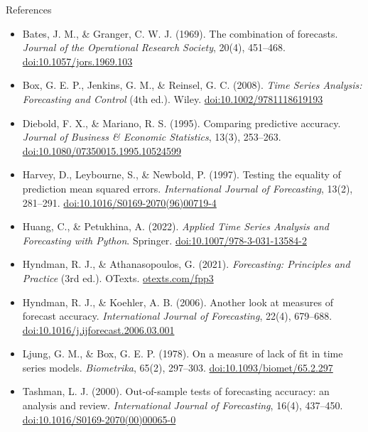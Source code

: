 \begin{frame}{References}
\itemsize{\tiny}
\begin{itemize}
    \item Bates, J. M., \& Granger, C. W. J. (1969). The combination of forecasts. \textit{Journal of the Operational Research Society}, 20(4), 451--468. \href{https://doi.org/10.1057/jors.1969.103}{doi:10.1057/jors.1969.103}
    \item Box, G. E. P., Jenkins, G. M., \& Reinsel, G. C. (2008). \textit{Time Series Analysis: Forecasting and Control} (4th ed.). Wiley. \href{https://doi.org/10.1002/9781118619193}{doi:10.1002/9781118619193}
    \item Diebold, F. X., \& Mariano, R. S. (1995). Comparing predictive accuracy. \textit{Journal of Business \& Economic Statistics}, 13(3), 253--263. \href{https://doi.org/10.1080/07350015.1995.10524599}{doi:10.1080/07350015.1995.10524599}
    \item Harvey, D., Leybourne, S., \& Newbold, P. (1997). Testing the equality of prediction mean squared errors. \textit{International Journal of Forecasting}, 13(2), 281--291. \href{https://doi.org/10.1016/S0169-2070(96)00719-4}{doi:10.1016/S0169-2070(96)00719-4}
    \item Huang, C., \& Petukhina, A. (2022). \textit{Applied Time Series Analysis and Forecasting with Python}. Springer. \href{https://doi.org/10.1007/978-3-031-13584-2}{doi:10.1007/978-3-031-13584-2}
    \item Hyndman, R. J., \& Athanasopoulos, G. (2021). \textit{Forecasting: Principles and Practice} (3rd ed.). OTexts. \href{https://otexts.com/fpp3/}{otexts.com/fpp3}
    \item Hyndman, R. J., \& Koehler, A. B. (2006). Another look at measures of forecast accuracy. \textit{International Journal of Forecasting}, 22(4), 679--688. \href{https://doi.org/10.1016/j.ijforecast.2006.03.001}{doi:10.1016/j.ijforecast.2006.03.001}
    \item Ljung, G. M., \& Box, G. E. P. (1978). On a measure of lack of fit in time series models. \textit{Biometrika}, 65(2), 297--303. \href{https://doi.org/10.1093/biomet/65.2.297}{doi:10.1093/biomet/65.2.297}
    \item Tashman, L. J. (2000). Out-of-sample tests of forecasting accuracy: an analysis and review. \textit{International Journal of Forecasting}, 16(4), 437--450. \href{https://doi.org/10.1016/S0169-2070(00)00065-0}{doi:10.1016/S0169-2070(00)00065-0}
\end{itemize}
\end{frame}


